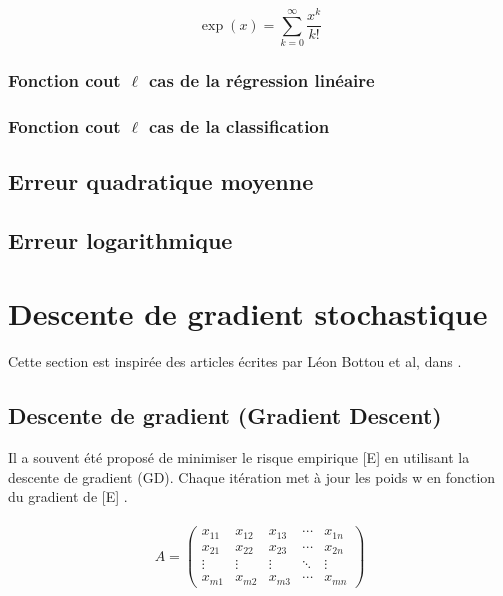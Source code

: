 	\[\exp(x)=\sum_{k=0}^{\infty}\frac{x^k}{k!}\]
	\lipsum[4]
	\subsubsection{Fonction cout $\ell$ cas de la régression linéaire}
	\lipsum[1]
	\subsubsection{Fonction cout $\ell$ cas  de la classification}
	\lipsum[1]
	
	\subsection{Erreur quadratique moyenne }
	\lipsum[1] %
	\subsection{Erreur logarithmique}
	\lipsum[1]
	
	
	
	
	\section{Descente de gradient stochastique}
	Cette section est inspirée des articles écrites par Léon Bottou et al, dans  \cite{bottou2012stochastic} 
	\cite{bottou2010large}
	\cite{framling2004scaled}
	\cite{bottou2018optimization}
	\cite{netrapalli2019stochastic}
	\cite{wijnhoven2010fast}.
	
	\subsection{Descente de gradient (Gradient Descent)}
	
	
	Il a souvent été proposé de minimiser le risque empirique [E] en utilisant la descente de gradient (GD). Chaque itération met à jour les poids w en fonction du gradient de [E] \cite{bottou2012stochastic}.\\
	
	\lipsum[1] \\ 
	
	$$A = \begin{pmatrix}
		x_{11} & x_{12} & x_{13} & \cdots & x_{1n} \\
		x_{21} & x_{22} & x_{23} & \cdots & x_{2n} \\
		\vdots & \vdots & \vdots & \ddots & \vdots \\
		x_{m1} & x_{m2} & x_{m3} & \cdots & x_{mn} 
	\end{pmatrix}$$
	
